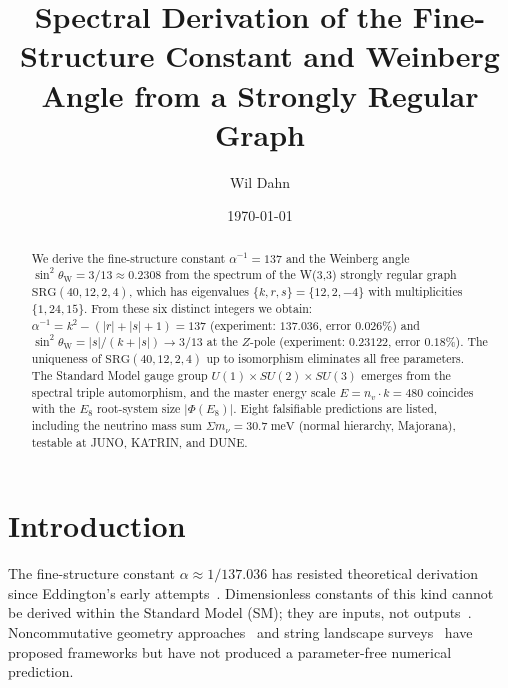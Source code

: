 \documentclass[aps,prl,twocolumn,showpacs,preprintnumbers,amsmath,amssymb]{revtex4-2}
\newcommand{\SRG}{\mathrm{SRG}}
\newcommand{\Eeight}{E_8}
\newcommand{\nv}{n_{\!v}}
\newcommand{\alphafs}{\alpha^{-1}}
\newcommand{\sinW}{\sin^2\!\theta_{\mathrm{W}}}
\newcommand{\sumnu}{\Sigma m_\nu}
\begin{document}

\title{Spectral Derivation of the Fine-Structure Constant and
       Weinberg Angle from a Strongly Regular Graph}

\author{Wil Dahn}

\date{\today}

\begin{abstract}
We derive the fine-structure constant $\alphafs = 137$ and the
Weinberg angle $\sinW = 3/13 \approx 0.2308$ from the spectrum of the
W(3,3) strongly regular graph $\SRG(40,12,2,4)$, which has eigenvalues
$\{k,r,s\}=\{12,2,-4\}$ with multiplicities $\{1,24,15\}$.
From these six distinct integers we obtain:
$\alphafs = k^2 - (|r|+|s|+1) = 137$ (experiment: $137.036$, error
$0.026\%$) and $\sinW = |s|/(k+|s|) \to 3/13$ at the $Z$-pole
(experiment: $0.23122$, error $0.18\%$).
The uniqueness of $\SRG(40,12,2,4)$ up to isomorphism eliminates
all free parameters. The Standard Model gauge group
$U(1)\times SU(2)\times SU(3)$ emerges from the spectral triple
automorphism, and the master energy scale $E = \nv \cdot k = 480$
coincides with the $\Eeight$ root-system size $|\Phi(\Eeight)|$.
Eight falsifiable predictions are listed, including the neutrino
mass sum $\sumnu = 30.7\;\mathrm{meV}$ (normal hierarchy, Majorana),
testable at JUNO, KATRIN, and DUNE.
\end{abstract}


\maketitle

\section{Introduction}
\label{sec:intro}

The fine-structure constant $\alpha \approx 1/137.036$ has resisted
theoretical derivation since Eddington's early attempts~\cite{Eddington1946}.
Dimensionless constants of this kind cannot be derived within the Standard
Model (SM); they are inputs, not outputs~\cite{Weinberg1993}.
Noncommutative geometry approaches~\cite{Connes1994,ConnesChamseddine1997}
and string landscape surveys~\cite{Susskind2003} have proposed frameworks
but have not produced a parameter-free numerical prediction.
\end{document}
